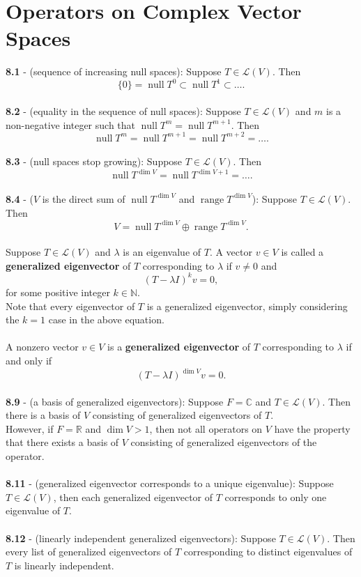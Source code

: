 \documentclass{article}
\DeclareMathOperator{\Null}{null}
\DeclareMathOperator{\Range}{range}
\DeclareMathOperator{\Dim}{dim}
\theoremstyle{definition}
\begin{document}
\section*{Operators on Complex Vector Spaces}
\textbf{8.1} - (sequence of increasing null spaces): Suppose $T \in \mathcal{L}(V)$. Then $$\{0\} = \Null{T^0} \subset \Null{T^1} \subset \dots.$$ \\
\textbf{8.2} - (equality in the sequence of null spaces): Suppose $T \in \mathcal{L}(V)$ and $m$ is a non-negative integer such that $\Null{T^m} = \Null{T^{m + 1}}$. Then $$\Null{T^m} = \Null{T^{m + 1}} = \Null{T^{m + 2}} = \dots.$$ \\
\textbf{8.3} - (null spaces stop growing): Suppose $T \in \mathcal{L}(V)$. Then $$\Null{T^{\Dim{V}}} = \Null{T^{\Dim{V} + 1}} = \dots.$$ \\
\textbf{8.4} - ($V$ is the direct sum of $\Null{T^{\Dim{V}}}$ and $\Range{T^{\Dim{V}}}$): Suppose $T \in \mathcal{L}(V)$. Then $$V = \Null{T^{\Dim{V}}} \oplus \Range{T^{\Dim{V}}}.$$ \\
Suppose $T \in \mathcal{L}(V)$ and $\lambda$ is an eigenvalue of $T$. A vector $v \in V$ is called a \textbf{generalized eigenvector} of $T$ corresponding to $\lambda$ if $v \neq 0$ and $$(T - \lambda I)^k v = 0,$$ for some positive integer $k \in \mathbb{N}$. \\
Note that every eigenvector of $T$ is a generalized eigenvector, simply considering the $k = 1$ case in the above equation. \\ \\
A nonzero vector $v \in V$ is a \textbf{generalized eigenvector} of $T$ corresponding to $\lambda$ if and only if $$(T - \lambda I)^{\Dim{V}} v = 0.$$ \\
\textbf{8.9} - (a basis of generalized eigenvectors): Suppose $F = \mathbb{C}$ and $T \in \mathcal{L}(V)$. Then there is a basis of $V$ consisting of generalized eigenvectors of $T$. \\
However, if $F = \mathbb{R}$ and $\Dim{V} > 1$, then not all operators on $V$ have the property that there exists a basis of $V$ consisting of generalized eigenvectors of the operator. \\ \\
\textbf{8.11} - (generalized eigenvector corresponds to a unique eigenvalue): Suppose $T \in \mathcal{L}(V)$, then each generalized eigenvector of $T$ corresponds to only one eigenvalue of $T$. \\ \\
\textbf{8.12} - (linearly independent generalized eigenvectors): Suppose $T \in \mathcal{L}(V)$. Then every list of generalized eigenvectors of $T$ corresponding to distinct eigenvalues of $T$ is linearly independent. \\ \\
\end{document}

